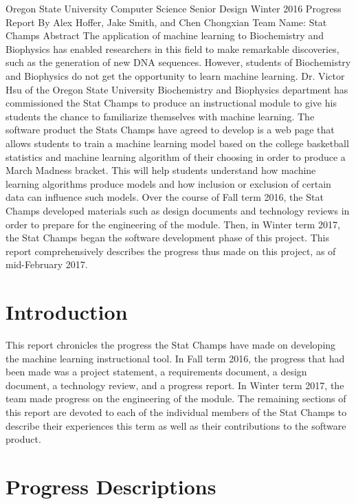 \documentclass[letterpaper, 10pt,titlepage]{article}
\begin{document}
\begin{center}

Oregon State University Computer Science Senior Design Winter 2016
\bigbreak
Progress Report
\bigbreak
By Alex Hoffer, Jake Smith, and Chen Chongxian
\bigbreak
Team Name: Stat Champs
\bigbreak
\vspace{3.0cm}
Abstract
\bigbreak
The application of machine learning to Biochemistry and Biophysics has enabled researchers in this field to make remarkable discoveries, such as the generation of new DNA sequences. However, students of Biochemistry and Biophysics do not get the opportunity to learn machine learning. Dr. Victor Hsu of the Oregon State University Biochemistry and Biophysics department has commissioned the Stat Champs to produce an instructional module to give his students the chance to familiarize themselves with machine learning. The software product the Stats Champs have agreed to develop is a web page that allows students to train a machine learning model based on the college basketball statistics and machine learning algorithm of their choosing in order to produce a March Madness bracket. This will help students understand how machine learning algorithms produce models and how inclusion or exclusion of certain data can influence such models. Over the course of Fall term 2016, the Stat Champs developed materials such as design documents and technology reviews in order to prepare for the engineering of the module. Then, in Winter term 2017, the Stat Champs began the software development phase of this project. This report comprehensively describes the progress thus made on this project, as of mid-February 2017.
\newpage
\end{center}

\tableofcontents

\newpage
\section{Introduction}
	This report chronicles the progress the Stat Champs have made on developing the machine learning instructional tool. In Fall term 2016, the progress that had been made was a project statement, a requirements document, a design document, a technology review, and a progress report. In Winter term 2017, the team made progress on the engineering of the module. The remaining sections of this report are devoted to each of the individual members of the Stat Champs to describe their experiences this term as well as their contributions to the software product.
\section{Progress Descriptions}
\end{document}

